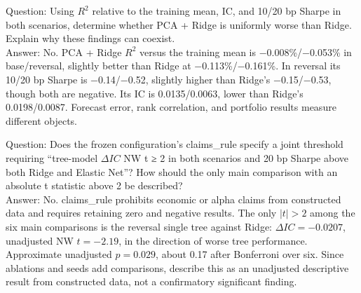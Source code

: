 \clearpage
{}
Question: Using \(R^2\) relative to the training mean, IC, and 10/20 bp Sharpe in both scenarios, determine whether PCA + Ridge is uniformly worse than Ridge. Explain why these findings can coexist.\\
Answer: No. PCA + Ridge \(R^2\) versus the training mean is −0.008\%/−0.053\% in base/reversal, slightly better than Ridge at −0.113\%/−0.161\%. In reversal its 10/20 bp Sharpe is −0.14/−0.52, slightly higher than Ridge's −0.15/−0.53, though both are negative. Its IC is 0.0135/0.0063, lower than Ridge's 0.0198/0.0087. Forecast error, rank correlation, and portfolio results measure different objects.

\clearpage
{}
Question: Does the frozen configuration's claims\_rule specify a joint threshold requiring “tree-model \(\Delta IC\) NW t ≥ 2 in both scenarios and 20 bp Sharpe above both Ridge and Elastic Net”? How should the only main comparison with an absolute t statistic above 2 be described?\\
Answer: No. claims\_rule prohibits economic or alpha claims from constructed data and requires retaining zero and negative results. The only \(|t|>2\) among the six main comparisons is the reversal single tree against Ridge: \(\Delta IC=-0.0207\), unadjusted NW \(t=-2.19\), in the direction of worse tree performance. Approximate unadjusted \(p=0.029\), about 0.17 after Bonferroni over six. Since ablations and seeds add comparisons, describe this as an unadjusted descriptive result from constructed data, not a confirmatory significant finding.


